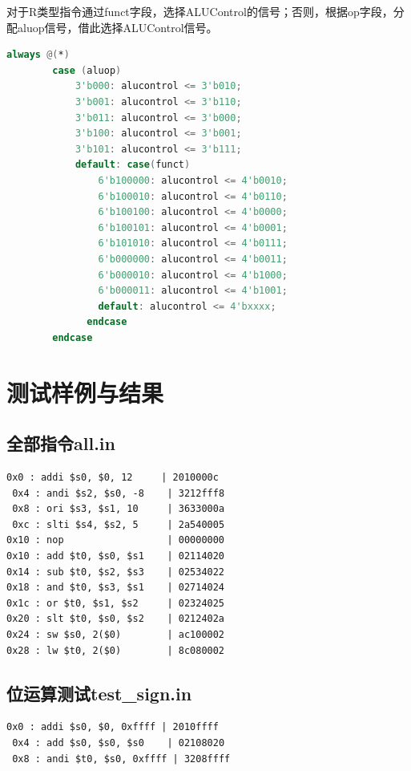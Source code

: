 \documentclass[twocolumn]{article} %
\begin{document}
\begin{sloppypar}
对于R类型指令通过funct字段，选择ALUControl的信号；否则，根据op字段，分配aluop信号，借此选择ALUControl信号。
\begin{lstlisting}[language=Verilog]  
always @(*)
        case (aluop)
            3'b000: alucontrol <= 3'b010; 
            3'b001: alucontrol <= 3'b110; 
            3'b011: alucontrol <= 3'b000; 
            3'b100: alucontrol <= 3'b001; 
            3'b101: alucontrol <= 3'b111; 
            default: case(funct)
                6'b100000: alucontrol <= 4'b0010; 
                6'b100010: alucontrol <= 4'b0110; 
                6'b100100: alucontrol <= 4'b0000; 
                6'b100101: alucontrol <= 4'b0001; 
                6'b101010: alucontrol <= 4'b0111; 
                6'b000000: alucontrol <= 4'b0011; 
                6'b000010: alucontrol <= 4'b1000; 
                6'b000011: alucontrol <= 4'b1001; 
                default: alucontrol <= 4'bxxxx; 
              endcase
        endcase
\end{lstlisting}  


\section{测试样例与结果}

\subsection{全部指令all.in}

\begin{lstlisting}[]  
 0x0 : addi $s0, $0, 12     | 2010000c
 0x4 : andi $s2, $s0, -8    | 3212fff8
 0x8 : ori $s3, $s1, 10     | 3633000a
 0xc : slti $s4, $s2, 5     | 2a540005
0x10 : nop                  | 00000000
0x10 : add $t0, $s0, $s1    | 02114020
0x14 : sub $t0, $s2, $s3    | 02534022
0x18 : and $t0, $s3, $s1    | 02714024
0x1c : or $t0, $s1, $s2     | 02324025
0x20 : slt $t0, $s0, $s2    | 0212402a
0x24 : sw $s0, 2($0)        | ac100002
0x28 : lw $t0, 2($0)        | 8c080002
\end{lstlisting}  

\subsection{位运算测试test\_sign.in}

\begin{lstlisting}[]  
 0x0 : addi $s0, $0, 0xffff | 2010ffff
 0x4 : add $s0, $s0, $s0    | 02108020
 0x8 : andi $t0, $s0, 0xffff | 3208ffff
\end{lstlisting}  


\end{sloppypar}
\end{document}
